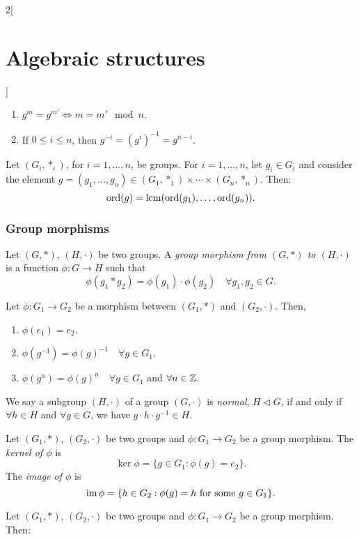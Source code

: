 \documentclass[../../../main.tex]{subfiles}
\begin{document}
\begin{multicols}{2}[\section{Algebraic structures}]
\begin{lemma}
\begin{enumerate}
        \item $g^m=g^{m'}\iff m=m'\mod{n}$.
        \item If $0\leq i\leq n$, then $g^{-i}=(g^i)^{-1}=g^{n-i}$.
    \end{enumerate}
\end{lemma}
\begin{corollary}
    Let $(G_i,*_i)$, for $i=1,\ldots, n$, be groups. For $i=1,\ldots,n$, let $g_i\in G_i$ and consider the element $g=(g_1,\ldots,g_n)\in(G_1,*_1)\times\cdots\times(G_n,*_n)$. Then: $$\text{ord}(g)=\operatorname{lcm}(\text{ord}(g_1),\ldots,\text{ord}(g_n)).$$
\end{corollary}
\subsubsection{Group morphisms}
\begin{definition}\label{AS-groupmorphism}
    Let $(G,*)$, $(H,\cdot)$ be two groups. A \textit{group morphism from $(G,*)$ to $(H,\cdot)$} is a function $\phi:G\rightarrow H$ such that $$\phi(g_1*g_2)=\phi(g_1)\cdot\phi(g_2)\quad\forall g_1,g_2\in G.$$
\end{definition}
\begin{lemma}
    Let $\phi:G_1\rightarrow G_2$ be a morphism between $(G_1,*)$ and $(G_2,\cdot)$. Then,
    \begin{enumerate}
        \item $\phi(e_1)=e_2$.
        \item $\phi(g^{-1})=\phi(g)^{-1}\quad\forall g\in G_1$.
        \item $\phi(g^n)=\phi(g)^n\quad\forall g\in G_1$ and $\forall n\in\mathbb{Z} $.
    \end{enumerate}
\end{lemma}
\begin{definition}
    We say a subgroup $(H,\cdot)$ of a group $(G,\cdot)$ is \textit{normal}, $H\lhd G$, if and only if $\forall h\in H$ and $\forall g\in G$, we have $g\cdot h\cdot g^{-1}\in H$.
\end{definition}
\begin{definition}
    Let $(G_1,*)$, $(G_2,\cdot)$ be two groups and $\phi:G_1\rightarrow G_2$ be a group morphism. The \textit{kernel of $\phi$} is $$\ker\phi=\{g\in G_1:\phi(g)=e_2\}.$$ The \textit{image of $\phi$} is $$\operatorname{im}\phi=\{h\in G_2:\phi(g)=h\text{ for some }g\in G_1\}.$$
\end{definition}
\begin{prop}
    Let $(G_1,*)$, $(G_2,\cdot)$ be two groups and $\phi:G_1\rightarrow G_2$ be a group morphism. Then:

\end{prop}
\end{multicols}
\end{document}
